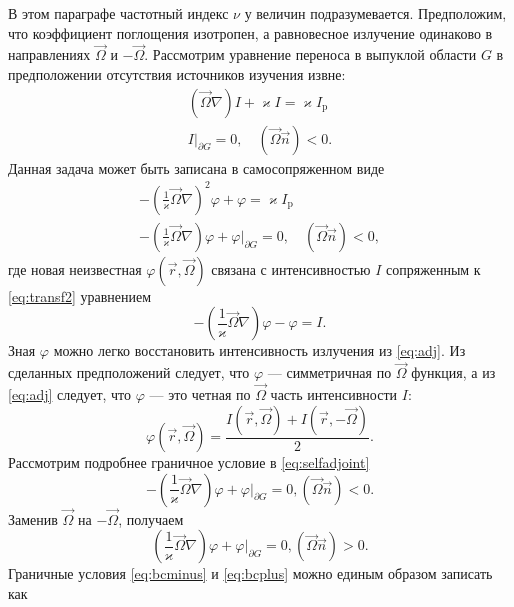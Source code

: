 В этом параграфе частотный индекс $\nu$ у величин подразумевается. Предположим, что коэффициент поглощения изотропен, а равновесное излучение одинаково в направлениях $\vec \Omega$ и $-\vec \Omega$.
Рассмотрим уравнение переноса в выпуклой области $G$ в предположении отсутствия источников изучения извне:
\begin{equation}
\begin{gathered}
(\vec \Omega \nabla) I + \varkappa I = \varkappa I_\text{p}\\
I\big|_{\partial G} = 0, \quad (\vec \Omega \vec n) < 0.
\label{eq:transf2}
\end{gathered}
\end{equation}
Данная задача может быть записана в самосопряженном виде
\begin{equation}
\begin{gathered}
-\left(\frac{1}{\varkappa}\vec \Omega \nabla\right)^2 \varphi + \varphi = \varkappa I_\text{p}\\
-\left(\frac{1}{\varkappa}\vec \Omega \nabla\right)\varphi + \varphi \Big|_{\partial G} = 0, \quad (\vec \Omega \vec n) < 0,
\end{gathered}
\label{eq:selfadjoint} 
\end{equation}
где новая неизвестная $\varphi(\vec r, \vec \Omega)$ связана с интенсивностью $I$ сопряженным к \eqref{eq:transf2} уравнением
\begin{equation}
-\left(\frac{1}{\varkappa}\vec \Omega \nabla\right)\varphi - \varphi = I.
\label{eq:adj}
\end{equation}
Зная $\varphi$ можно легко восстановить интенсивность излучения из \eqref{eq:adj}. Из сделанных предположений следует, что $\varphi$ --- симметричная по $\vec \Omega$ функция, а из \eqref{eq:adj} следует, что $\varphi$ --- это четная по $\vec \Omega$ часть интенсивности $I$:
\[
\varphi(\vec r, \vec \Omega) = \frac{I(\vec r, \vec \Omega) + I(\vec r, -\vec \Omega)}{2}.
\]
Рассмотрим подробнее граничное условие в \eqref{eq:selfadjoint} 
\begin{equation}
-\left(\frac{1}{\varkappa}\vec \Omega\nabla\right)\varphi + \varphi\Big|_{\partial G} = 0, (\vec \Omega \vec n) < 0.
\label{eq:bcminus}
\end{equation}
Заменив $\vec \Omega$ на $-\vec \Omega$, получаем
\begin{equation}
\left(\frac{1}{\varkappa}\vec \Omega\nabla\right)\varphi + \varphi\Big|_{\partial G} = 0, (\vec \Omega \vec n) > 0.
\label{eq:bcplus}
\end{equation}
Граничные условия \eqref{eq:bcminus} и \eqref{eq:bcplus} можно единым образом записать как
